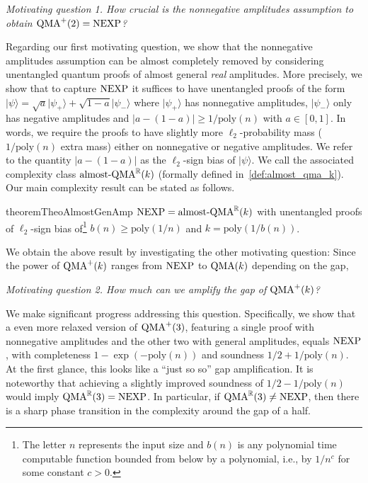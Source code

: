 \documentclass[10pt,a4paper]{article}
\theoremstyle{remark}
\newcommand{\ie}{i.e.,\xspace}
\newcommand{\R}{{\mathbb R}}
\newcommand{\abs}[1]{\ensuremath{\left\lvert #1 \right\rvert}}
\newcommand{\poly}{{\mathrm{poly}}}
\newcommand{\1}[1]{\mathds{1}{[#1]}}
\newcommand{\ket}[1]{\lvert #1\rangle}
\newcommand{\QMA}{\textup{QMA}}
\newcommand{\NEXP}{\textup{NEXP}}
\numberwithin{equation}{section}
\begin{document}
\begin{center}
{\it  Motivating question 1. How crucial is the nonnegative amplitudes assumption to obtain $\QMA^+(2)=\NEXP$?}
\end{center}
Regarding our first motivating question, we show that the nonnegative amplitudes assumption can be almost
completely removed by considering unentangled quantum proofs of almost general \emph{real} amplitudes.
%
More precisely, we show that to capture $\NEXP$ it suffices to have unentangled proofs of the form
$\ket{\psi} = \sqrt{a} \ket{\psi_+} + \sqrt{1-a} \ket{\psi_{-}}$ where
$\ket{\psi_+}$ has nonnegative amplitudes, $\ket{\psi_{-}}$ only has
negative amplitudes and $\abs{a-(1-a)} \ge 1/\poly(n)$ with $a \in [0,1]$.
%
In words, we require the proofs to have slightly more $\ell_2$-probability mass ($1/\poly(n)$ extra mass) either on
nonnegative or negative amplitudes.
%
We refer to the quantity $\abs{a-(1-a)}$ as the $\ell_2$-sign bias of $\ket{\psi}$.
%
We call the associated complexity class $\textup{almost-QMA}^\R(k)$ (formally defined in~\cref{def:almost_qma_k}).
Our main complexity result can be stated as follows.

\begin{restatable}{theorem}{TheoAlmostGenAmp}\label{thm:almost_gen_amp}
  $\NEXP = \textup{almost-QMA}^\R(k)$ with unentangled proofs of $\ell_2$-sign bias of\footnote{The letter $n$ represents the
  input size and $b(n)$ is any polynomial time computable function bounded from below by a polynomial, \ie by $1/n^c$ for
  some constant $c > 0$.} $b(n) \ge \poly(1/n)$ and $k=\poly(1/b(n))$.
\end{restatable}

We obtain the above result by investigating the other motivating question: Since the power of $\QMA^+(k)$
ranges from $\NEXP$ to $\QMA(k)$ depending on the gap,


\begin{center}{\it Motivating question 2.
  How much can we amplify the gap of $\QMA^+(k)$?}
\end{center}

We make significant progress addressing this question.
%
Specifically, we show that a even more relaxed version of $\QMA^+(3)$, featuring
a single proof with nonnegative amplitudes and the other two with general amplitudes,
equals $\NEXP$, with completeness $1-\exp(-\poly(n))$ and soundness $1/2+1/\poly(n)$.
%
At the first glance, this looks like a ``just so so'' gap amplification.
%
It is noteworthy that achieving a slightly improved soundness of $1/2-1/\poly(n)$ would
imply $\QMA^\R(3)=\NEXP$.
%
In particular, if $\QMA^\R(3) \ne \NEXP$, then there is a sharp phase
transition in the complexity around the gap of a half.
\end{document}
